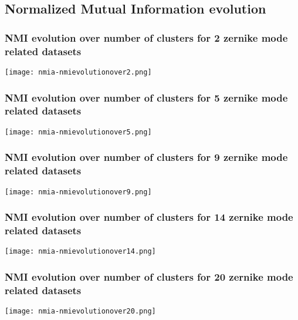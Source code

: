 \subsection{Normalized Mutual Information evolution}

	\subsubsection{NMI evolution over number of clusters for 2 zernike mode related datasets}
		\begin{figure*}[ht!]
			\centering
			\texttt{[image: nmia-nmievolutionover2.png]}
		\end{figure*}
		\FloatBarrier
		
	\subsubsection{NMI evolution over number of clusters for 5 zernike mode related datasets}
		\begin{figure*}[ht!]
			\centering
			\texttt{[image: nmia-nmievolutionover5.png]}
		\end{figure*}
		\FloatBarrier
		
	\subsubsection{NMI evolution over number of clusters for 9 zernike mode related datasets}
		\begin{figure*}[ht!]
			\centering
			\texttt{[image: nmia-nmievolutionover9.png]}
		\end{figure*}
		\FloatBarrier
		
	\subsubsection{NMI evolution over number of clusters for 14 zernike mode related datasets}
		\begin{figure*}[ht!]
			\centering
			\texttt{[image: nmia-nmievolutionover14.png]}
		\end{figure*}
		\FloatBarrier
		
	\subsubsection{NMI evolution over number of clusters for 20 zernike mode related datasets}
		\begin{figure*}[ht!]
			\centering
			\texttt{[image: nmia-nmievolutionover20.png]}
		\end{figure*}
		\FloatBarrier
		
